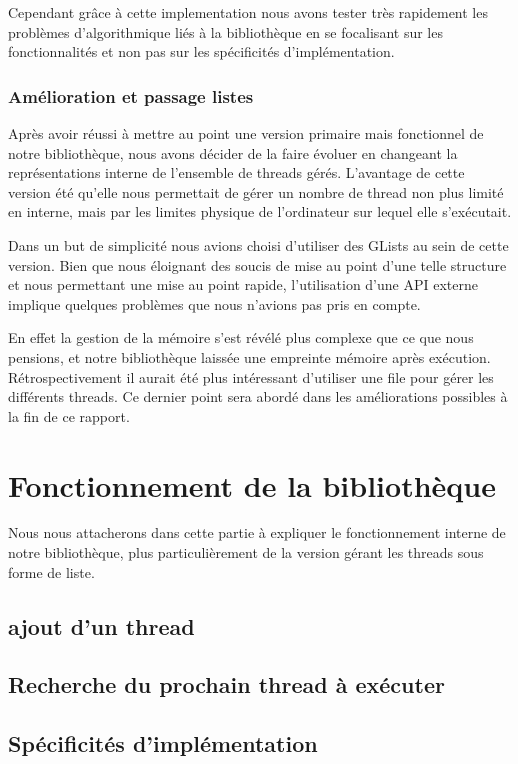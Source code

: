 \documentclass{article}
\begin{document}
			Cependant grâce à cette implementation nous avons tester très rapidement les problèmes d'algorithmique liés à la bibliothèque en se focalisant sur les fonctionnalités et non pas sur les spécificités d'implémentation.

			\subsubsection{Amélioration et passage listes}
			Après avoir réussi à mettre au point une version primaire mais fonctionnel de notre bibliothèque, nous avons décider de la faire évoluer en changeant la représentations interne de l'ensemble de threads gérés.
			L'avantage de cette version été qu'elle nous permettait de gérer un nombre de thread non plus limité en interne, mais par les limites physique de l'ordinateur sur lequel elle s'exécutait.
			
			Dans un but de simplicité nous avions choisi d'utiliser des GLists au sein de cette version. Bien que nous éloignant des soucis de mise au point d'une telle structure et nous permettant une mise au point rapide, l'utilisation d'une API externe implique quelques problèmes que nous n'avions pas pris en compte.
			
			En effet la gestion de la mémoire s'est révélé plus complexe que ce que nous pensions, et notre bibliothèque laissée une empreinte mémoire après exécution.
			Rétrospectivement il aurait été plus intéressant d'utiliser une file pour gérer les différents threads. Ce dernier point sera abordé dans les améliorations possibles à la fin de ce rapport.
			

	\section{Fonctionnement de la bibliothèque}
	Nous nous attacherons dans cette partie à expliquer le fonctionnement interne de notre bibliothèque, plus particulièrement de la version gérant les threads sous forme de liste.

		\subsection{ajout d'un thread}

		\subsection{Recherche du prochain thread à exécuter}

		\subsection{Spécificités d'implémentation}
		
\end{document}
